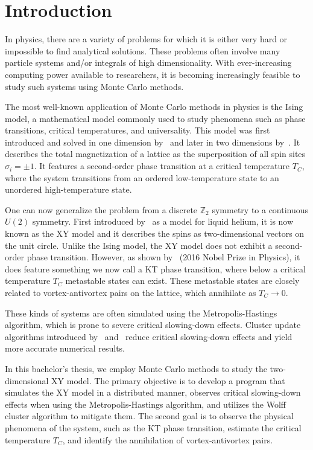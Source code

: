 \chapter{Introduction}\label{chap:introduction}
	In physics, there are a variety of problems for which it is either very hard or impossible to find analytical solutions. These problems often involve many particle systems and/or integrals of high dimensionality. With ever-increasing computing power available to researchers, it is becoming increasingly feasible to study such systems using Monte Carlo methods.
	
	The most well-known application of Monte Carlo methods in physics is the Ising model, a mathematical model commonly used to study phenomena such as phase transitions, critical temperatures, and universality. This model was first introduced and solved in one dimension by~\cite{ising} and later in two dimensions by~\cite{onsager}. It describes the total magnetization of a lattice as the superposition of all spin sites $\sigma_i = \pm 1$. It features a second-order phase transition at a critical temperature $T_C$, where the system transitions from an ordered low-temperature state to an unordered high-temperature state.
	
	One can now generalize the problem from a discrete $\mathbb{Z}_2$ symmetry to a continuous $U(2)$ symmetry. First introduced by~\cite{matsubara} as a model for liquid helium, it is now known as the XY model and it describes the spins as two-dimensional vectors on the unit circle. Unlike the Ising model, the XY model does not exhibit a second-order phase transition. However, as shown by~\cite{kosterlitz} (2016 Nobel Prize in Physics), it does feature something we now call a KT phase transition, where below a critical temperature $T_C$ metastable states can exist. These metastable states are closely related to vortex-antivortex pairs on the lattice, which annihilate as $T_C \rightarrow 0$.
	
	These kinds of systems are often simulated using the Metropolis-Hastings algorithm, which is prone to severe critical slowing-down effects. Cluster update algorithms introduced by~\cite{sw} and~\cite{wolff} reduce critical slowing-down effects and yield more accurate numerical results.
	
	In this bachelor's thesis, we employ Monte Carlo methods to study the two-dimensional XY model. The primary objective is to develop a program that simulates the XY model in a distributed manner, observes critical slowing-down effects when using the Metropolis-Hastings algorithm, and utilizes the Wolff cluster algorithm to mitigate them. The second goal is to observe the physical phenomena of the system, such as the KT phase transition, estimate the critical temperature $T_C$, and identify the annihilation of vortex-antivortex pairs.
	